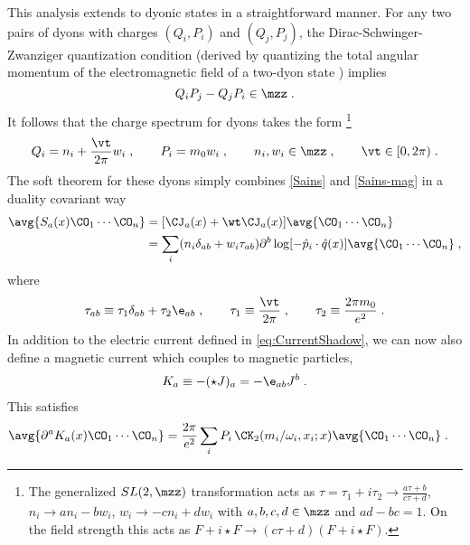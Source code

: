 \documentclass[11pt]{article}
\def\d{{\delta}}
\def\o{{\omega}}
\def\p{{\partial}}
\begin{document}
This analysis extends to dyonic states in a straightforward manner. For any two pairs of dyons with charges $(Q_i,P_i)$ and $(Q_j,P_j)$, the Dirac-Schwinger-Zwanziger quantization condition (derived by quantizing the total angular momentum of the electromagnetic field of a two-dyon state \cite{Goddard_1978}) implies
\begin{equation}
\label{SZquantcond}
Q_i P_j - Q_j P_i \in \mzz \; .
\end{equation}
It follows that the charge spectrum for dyons takes the form \cite{Olive:1995sw}\footnote{The generalized $SL(2,\mzz)$ transformation acts as $\tau = \tau_1 + i \tau_2  \to \frac{ a \tau + b }{ c \tau + d }$, $n_i \to a n_i - b w_i$, $w_i \to - c n_i + d w_i$ with $a,b,c,d\in\mzz$ and $ad-bc=1$. On the field strength this acts as $F + i \star F \to ( c \tau + d ) ( F + i \star F )$.}
\begin{equation}
\begin{split}\label{chargesol}
Q_i = n_i + \frac{\vt}{2\pi} w_i \; , \qquad P_i = m_0 w_i \; , \qquad n_i,w_i\in\mzz \; , \qquad \vt \in [ 0 , 2\pi )\; .
\end{split}
\end{equation}
The soft theorem for these dyons simply combines \eqref{Sains} and \eqref{Sains-mag} in a duality covariant way
\begin{equation}
\begin{split}\label{Sains-dyon}
\avg{ S_a(x) \CO_1 \cdots \CO_n } &=  [ \CJ_a(x) + {\wt \CJ}_a(x) ] \avg{ \CO_1 \cdots \CO_n  } \\
&= \sum_i  ( n_i \d_{ab} +  w_i  \tau_{ab} )  \p^b \log [ - {\hat p}_i \cdot {\hat q}(x) ] \avg{ \CO_1 \cdots \CO_n  } \; ,
\end{split}
\end{equation}
where
\begin{equation}
\label{taudef}
\tau_{ab} \equiv \tau_1 \d_{ab}  + \tau_2 \e_{ab} \; , \qquad \tau_1 \equiv \frac{\vt}{2\pi}   \; , \qquad \tau_2 \equiv \frac{2\pi m_0}{e^2}   \; . 
\end{equation}
In addition to the electric current defined in \eqref{eq:CurrentShadow}, we can now also define a magnetic current which couples to magnetic particles,
\begin{equation}
\begin{split}\label{Kacurrdef}
K_a \equiv  -(\star J)_a =-\e_{ab} J^b \; . 
\end{split}
\end{equation}
This satisfies
\begin{equation}
\begin{split}
\avg{ \p^a K_a (x) \CO_1 \cdots \CO_n } &= \frac{2\pi}{e^2} \sum_i P_i \, \CK_2 ( m_i / \o_i , x_i ; x )  \avg{\CO_1 \cdots \CO_n  } \; .
\end{split}
\end{equation}
\end{document}
